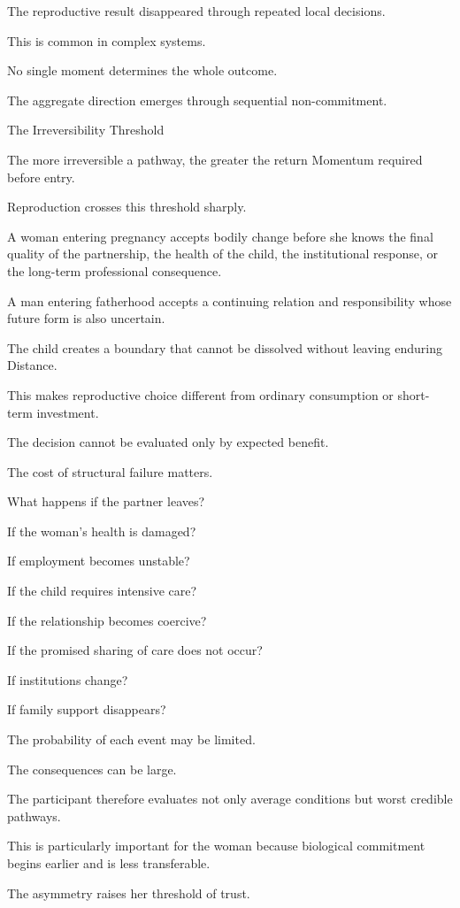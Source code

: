 The reproductive result disappeared through repeated local decisions.

This is common in complex systems.

No single moment determines the whole outcome.

The aggregate direction emerges through sequential non-commitment.

The Irreversibility Threshold

The more irreversible a pathway, the greater the return Momentum required before entry.

Reproduction crosses this threshold sharply.

A woman entering pregnancy accepts bodily change before she knows the final quality of the partnership, the health of the child, the institutional response, or the long-term professional consequence.

A man entering fatherhood accepts a continuing relation and responsibility whose future form is also uncertain.

The child creates a boundary that cannot be dissolved without leaving enduring Distance.

This makes reproductive choice different from ordinary consumption or short-term investment.

The decision cannot be evaluated only by expected benefit.

The cost of structural failure matters.

What happens if the partner leaves?

If the woman’s health is damaged?

If employment becomes unstable?

If the child requires intensive care?

If the relationship becomes coercive?

If the promised sharing of care does not occur?

If institutions change?

If family support disappears?

The probability of each event may be limited.

The consequences can be large.

The participant therefore evaluates not only average conditions but worst credible pathways.

This is particularly important for the woman because biological commitment begins earlier and is less transferable.

The asymmetry raises her threshold of trust.

